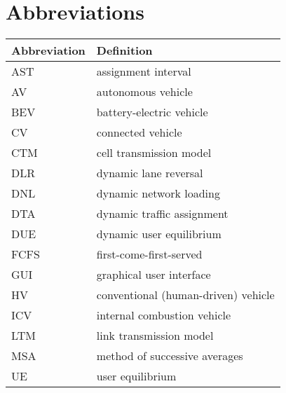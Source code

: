 \chapter{Abbreviations}

\begin{longtable}{ll}
\hline
Abbreviation & Definition\\\hline
\endhead
AST & assignment interval\\
AV & autonomous vehicle\\
BEV & battery-electric vehicle\\
CV & connected vehicle \\
CTM &  cell transmission model~\cite{daganzo1994cell, daganzo1995cell}\\
DLR & dynamic lane reversal~\cite{levin2016cell, duell2016system} \\
DNL & dynamic network loading~\cite{chiu2011dynamic} \\
DTA & dynamic traffic assignment~\cite{chiu2011dynamic} \\
DUE & dynamic user equilibrium~\cite{wardrop1952road, chiu2011dynamic} \\
FCFS & first-come-first-served~\cite{fajardo2011automated}\\
GUI & graphical user interface\\
HV & conventional (human-driven) vehicle\\
ICV & internal combustion vehicle\cite{levin2014effect}\\
LTM & link transmission model~\cite{yperman2005link, yperman2007link}\\
MSA & method of successive averages\cite{levin2014improving}\\
UE & user equilibrium~\cite{wardrop1952road}\\
\hline
\end{longtable}